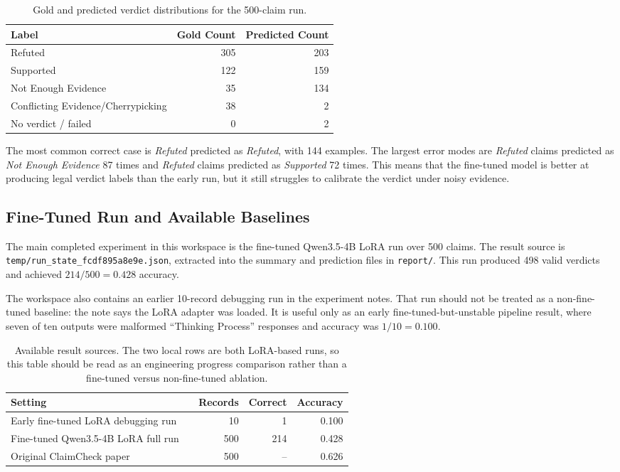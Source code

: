 \documentclass[11pt]{article}
\begin{document}
\begin{table}[h]
\centering
\begin{tabular}{lrr}
\hline
Label & Gold Count & Predicted Count \\
\hline
Refuted & 305 & 203 \\
Supported & 122 & 159 \\
Not Enough Evidence & 35 & 134 \\
Conflicting Evidence/Cherrypicking & 38 & 2 \\
No verdict / failed & 0 & 2 \\
\hline
\end{tabular}
\caption{Gold and predicted verdict distributions for the 500-claim run.}
\label{tab:label-distribution}
\end{table}

The most common correct case is \textit{Refuted} predicted as \textit{Refuted}, with 144 examples. The largest error modes are \textit{Refuted} claims predicted as \textit{Not Enough Evidence} 87 times and \textit{Refuted} claims predicted as \textit{Supported} 72 times. This means that the fine-tuned model is better at producing legal verdict labels than the early run, but it still struggles to calibrate the verdict under noisy evidence.

\subsection*{Fine-Tuned Run and Available Baselines}
The main completed experiment in this workspace is the fine-tuned Qwen3.5-4B LoRA run over 500 claims. The result source is \texttt{temp/run\_state\_fcdf895a8e9e.json}, extracted into the summary and prediction files in \texttt{report/}. This run produced 498 valid verdicts and achieved \(214/500 = 0.428\) accuracy.

The workspace also contains an earlier 10-record debugging run in the experiment notes. That run should not be treated as a non-fine-tuned baseline: the note says the LoRA adapter was loaded. It is useful only as an early fine-tuned-but-unstable pipeline result, where seven of ten outputs were malformed ``Thinking Process'' responses and accuracy was \(1/10 = 0.100\).

\begin{table}[h]
\centering
\begin{tabular}{p{0.56\linewidth}rrr}
\hline
Setting & Records & Correct & Accuracy \\
\hline
Early fine-tuned LoRA debugging run & 10 & 1 & 0.100 \\
Fine-tuned Qwen3.5-4B LoRA full run & 500 & 214 & 0.428 \\
Original ClaimCheck paper & 500 & -- & 0.626 \\
\hline
\end{tabular}
\caption{Available result sources. The two local rows are both LoRA-based runs, so this table should be read as an engineering progress comparison rather than a fine-tuned versus non-fine-tuned ablation.}
\label{tab:fine-tune-comparison}
\end{table}
\end{document}
